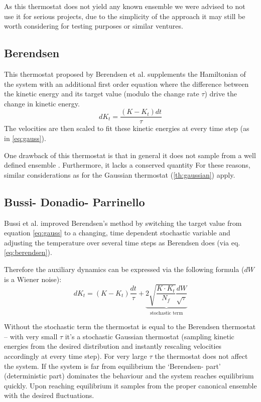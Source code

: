 As this thermostat does not yield any known ensemble we were advised to not use it for serious projects, due to the simplicity of the approach it may still be worth considering for testing purposes or similar ventures.



\subsection{Berendsen}
This thermostat proposed by Berendsen et al. \cite{Berendsen1984} supplements the Hamiltonian of the system with an additional first order equation where the difference between the kinetic energy and its target value (modulo the change rate $\tau$) drive the change in kinetic energy.
\begin{equation}
{dK_t} = \frac{(K-K_t)dt}{\tau} \label{eq:berendsen}%
\end{equation}
The velocities are then scaled to fit these kinetic energies at every time step (as in \eqref{eq:gauss}).

One drawback of this thermostat is that in general it does not sample from a well defined ensemble \cite{Morishita2000}. Furthermore, it lacks a conserved quantity \cite{Bussi2007} For these reasons, similar considerations as for the Gaussian thermostat (\ref{th:gaussian}) apply.
\subsection{Bussi- Donadio- Parrinello}
Bussi et al.\cite{Bussi2007} improved Berendsen's method by switching the target value from equation \eqref{eq:gauss} to a changing, time dependent stochastic variable and adjusting the temperature over several time steps as Berendsen does (via eq. \eqref{eq:berendsen}). 

Therefore the auxiliary dynamics can be expressed via the following formula ($dW$ is a Wiener noise):
\begin{equation}
dK_t = (K- K_t) \frac{dt}{\tau} + \underbrace{2\sqrt{\frac{K\cdot K_t}{N_f}}\frac{dW}{\sqrt{\tau}}}_{\text{stochastic term}}
\end{equation}

Without the stochastic term the thermostat is equal to the Berendsen thermostat -- with very small $\tau$ it's a stochastic Gaussian thermostat (sampling kinetic energies from the desired distribution and instantly rescaling velocities accordingly at every time step). For very large $\tau$ the thermostat does not affect the system. If the system is far from equilibrium the `Berendsen- part' (deterministic part) dominates the behaviour and the system reaches equilibrium quickly. Upon reaching equilibrium it samples from the proper canonical ensemble with the desired fluctuations.

